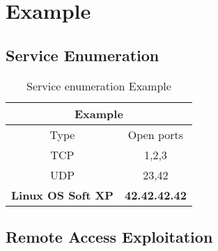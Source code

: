 
\renewcommand{\hostname}{Example}
\renewcommand{\os}{Linux OS Soft XP}
\renewcommand{\ip}{42.42.42.42}
\renewcommand{\tcpports}{1,2,3}
\renewcommand{\udpports}{23,42}
\renewcommand{\vuln}{CVE-123-42 \glqq Stupid Idiot User\grqq}
\renewcommand{\product}{Human}
\renewcommand{\vulnx}{CVE-123-43 \glqq Very Stupid Idiot User Again\grqq} 
\renewcommand{\productx}{Human}
\def\gotroot{}   %



\section{\hostname}
\subsection{Service Enumeration}

\begin{table}[h]
	\begin{tabular}{|c|c|}
		\hline
		\multicolumn{2}{|c|}{\textbf{\hostname}}\\\hline\hline
		Type         & Open ports   \\\hline
		TCP          & \tcpports{}  \\\hline
		UDP          & \udpports{}  \\\hline\hline
		\textbf{\os} & \textbf{\ip} \\\hline
	\end{tabular}
	\caption{Service enumeration \hostname}
\end{table}

\subsection{Remote Access Exploitation}

